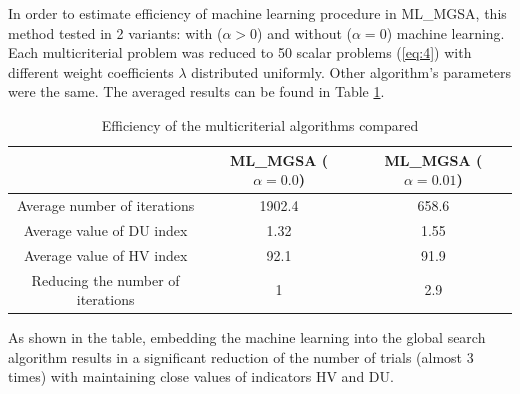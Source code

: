 \documentclass[runningheads]{llncs}
\begin{document}
In order to estimate efficiency of machine learning procedure in ML\_MGSA, this method tested in 2 variants: with ($\alpha>0$) and without ($\alpha=0$) machine learning. Each multicriterial problem was reduced to 50 scalar problems (\ref{eq:4}) with different weight coefficients $\lambda$ distributed uniformly. Other algorithm's parameters were the same. The averaged results can be found in Table \ref{tab:2}.

\begin{table}[]
\caption{Efficiency of the multicriterial algorithms compared}
\label{tab:2}
\begin{tabular}{ccc}
\hline
                                  & ML\_MGSA ($\alpha=0.0$) & ML\_MGSA ($\alpha=0.01$) \\ \hline
Average number of iterations      & 1902.4           & 658.6             \\
Average value of  DU index        & 1.32             & 1.55              \\
Average value of HV index         & 92.1             & 91.9              \\
Reducing the number of iterations & 1                & 2.9     \\  \hline        
\end{tabular}
\end{table}

As shown in the table, embedding the machine learning into the global search algorithm results in a significant reduction of the number of trials (almost 3 times) with maintaining close values of indicators HV and DU.



%
%
%
% 
% 
%


\end{document}
